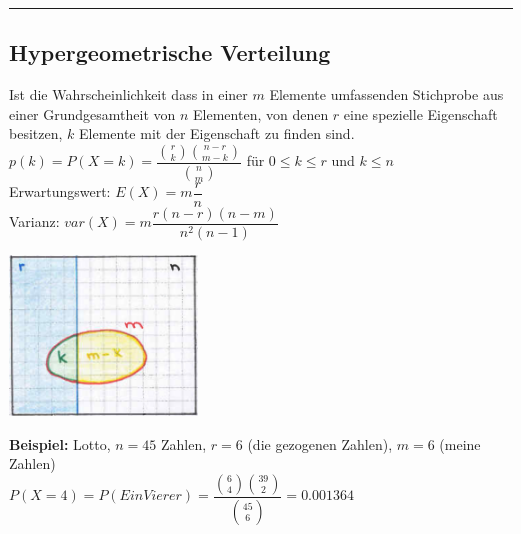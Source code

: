 \hrule

	\subsection{Hypergeometrische Verteilung  }
		\begin{minipage}{13cm}
        Ist die Wahrscheinlichkeit dass in einer $m$ Elemente umfassenden 
		Stichprobe aus einer Grundgesamtheit von $n$ Elementen, von denen $r$ eine
		spezielle Eigenschaft besitzen, $k$ Elemente mit der Eigenschaft zu
		finden sind.\\
		\vspace{5mm} 
		$p(k)=P(X=k)=\dfrac{\binom r k \binom{n-r}{m-k}}{\binom n m}$ 
        \hspace{10mm} für $0\leq k \leq r$ und $k \leq n$\\
        Erwartungswert: \hspace{10mm} $E(X)=m \dfrac{r}{n}$\\
        Varianz: \hspace{22mm} $var(X)=m \dfrac{r(n-r)(n-m)}{n^2(n-1)}$
        \end{minipage}
		\begin{minipage}{5cm}
        \includegraphics[width=5cm]{./bilder/hypergeo.png}
        \end{minipage}
		
		\vspace{3mm}
		{\bf Beispiel:} Lotto, $n=45$ Zahlen, $r=6$ (die gezogenen Zahlen), $m=6$
		(meine Zahlen)\\
		$P(X=4)=P(Ein Vierer)=\dfrac{\binom 6 4 \binom {39} 2}{\binom {45}
		6}=0.001364$
\newpage

